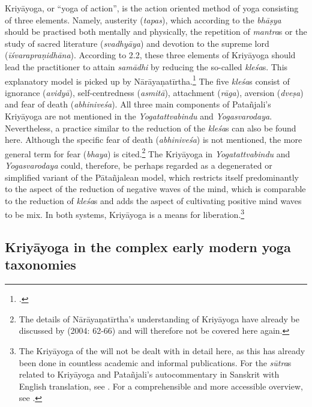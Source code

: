 Kriyāyoga, or ``yoga of action'', is the action oriented method of yoga consisting of three elements. Namely, austerity (\textit{tapas}), which according to the \textit{bhāṣya} should be practised both mentally and physically, the repetition of \textit{mantra}s or the study of sacred literature (\textit{svadhyāya}) and devotion to the supreme lord (\textit{īśvarapraṇidhāna}).
According to  2.2, these three elements of Kriyāyoga should lead the practitioner to attain \textit{samādhi} by reducing the so-called \textit{kleśa}s. This explanatory model is picked up by Nārāyaṇatīrtha.\footnote{\citeauthor[2000: 71]{yogacandrika}.} The five \textit{kleśa}s consist of ignorance (\textit{avidyā}), self-centredness (\textit{asmitā}), attachment (\textit{rāga}), aversion (\textit{dveṣa}) and fear of death (\textit{abhiniveśa}). 
All three main components of Patañjali's Kriyāyoga are not mentioned in the \textit{Yogatattvabindu} and \textit{Yogasvarodaya}. Nevertheless, a practice similar to the reduction of the \textit{kleśa}s can also be found here. Although the specific fear of death (\textit{abhiniveśa}) is not mentioned, the more general term for fear (\textit{bhaya}) is cited.\footnote{The details of Nārāyaṇatīrtha's understanding of Kriyāyoga have already be discussed by \citeauthor{penna2004} (2004: 62-66) and will therefore not be covered here again.}
The Kriyāyoga in \textit{Yogatattvabindu} and \textit{Yogasvarodaya} could, therefore, be perhaps regarded as a degenerated or simplified variant of the Pātañjalean model, which restricts itself predominantly to the aspect of the reduction of negative waves of the mind, which is comparable to the reduction of \textit{kleśa}s and adds the aspect of cultivating positive mind waves to be mix. In both systems, Kriyāyoga is a means for liberation.\footnote{The Kriyāyoga of the  will not be dealt with in detail here, as this has already been done in countless academic and informal publications. For the \textit{sūtra}s related to Kriyāyoga and Patañjali's autocommentary in Sanskrit with English translation, see \citeauthor[1983: 113 et seqq.]{yogasutra}. For a comprehensible and more accessible overview, see \citeauthor[2009: 170 et seqq.]{bryant2009}.}

\subsection{Kriyāyoga in the complex early modern yoga taxonomies}

